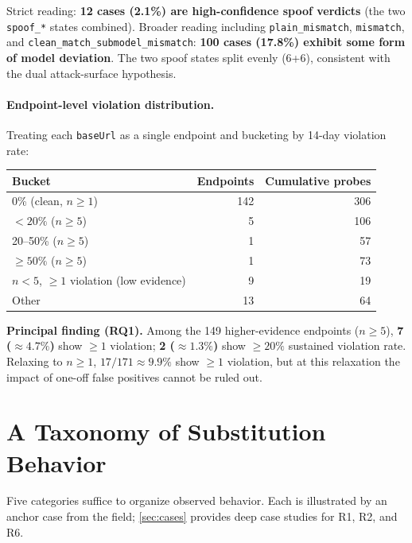 \documentclass[10pt,a4paper,twocolumn]{article}
\begin{document}
Strict reading: \textbf{12 cases (2.1\%) are high-confidence spoof verdicts}
(the two \texttt{spoof\_*} states combined). Broader reading including
\texttt{plain\_mismatch}, \texttt{mismatch}, and
\texttt{clean\_match\_submodel\_mismatch}: \textbf{100 cases (17.8\%) exhibit
some form of model deviation}. The two spoof states split evenly (6+6),
consistent with the dual attack-surface hypothesis.

\paragraph{Endpoint-level violation distribution.}
Treating each \texttt{baseUrl} as a single endpoint and bucketing by 14-day
violation rate:

\begin{table}[h]
\centering
\small
\begin{tabular}{@{}lrr@{}}
\toprule
Bucket & Endpoints & Cumulative probes \\
\midrule
0\% (clean, $n{\geq}1$) & 142 & 306 \\
$<20\%$ ($n{\geq}5$) & 5 & 106 \\
20--50\% ($n{\geq}5$) & 1 & 57 \\
$\geq 50\%$ ($n{\geq}5$) & 1 & 73 \\
$n{<}5$, ${\geq}1$ violation (low evidence) & 9 & 19 \\
Other & 13 & 64 \\
\bottomrule
\end{tabular}
\end{table}

\textbf{Principal finding (RQ1).} Among the 149 higher-evidence endpoints
($n{\geq}5$), \textbf{7 ($\approx 4.7\%$)} show ${\geq}1$ violation;
\textbf{2 ($\approx 1.3\%$)} show ${\geq}20\%$ sustained violation rate.
Relaxing to $n{\geq}1$, $17/171 \approx 9.9\%$ show ${\geq}1$ violation, but at
this relaxation the impact of one-off false positives cannot be ruled out.

\section{A Taxonomy of Substitution Behavior}\label{sec:taxonomy}

Five categories suffice to organize observed behavior. Each is illustrated by
an anchor case from the field; \cref{sec:cases} provides deep case studies for
R1, R2, and R6.
\end{document}
